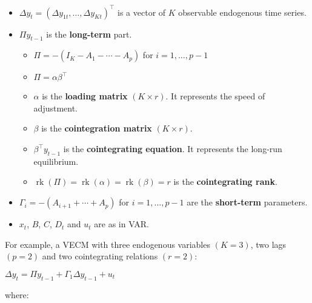 \documentclass[10pt, a4paper, landscape]{article}
\DeclareMathOperator{\rk}{rk}
\begin{document}
\begin{multicols}{2}
\begin{itemize}[leftmargin=*]
	\item \( \Delta y_{t} = (\Delta y_{1t}, \ldots, \Delta y_{Kt})^{\top} \) is a vector of \( K \) observable endogenous time series.
	\item \( \Pi y_{t - 1} \) is the \textbf{long-term} part.
	\begin{itemize}[leftmargin=*, label={\( \diamond \)}]
		\item \( \Pi = - (I_{K} - A_{1} - \cdots - A_{p}) \) for \( i = 1, \ldots, p - 1 \)
		\item \( \Pi = \alpha \beta^{\top} \)
		\item \( \alpha \) is the \textbf{loading matrix} \( (K \times r) \). It represents the speed of adjustment.
		\item \( \beta \) is the \textbf{cointegration matrix} \( (K \times r) \).
		\item \( \beta^{\top} y_{t - 1} \) is the \textbf{cointegrating equation}. It represents the long-run equilibrium.
		\item \( \rk(\Pi) = \rk(\alpha) = \rk(\beta) = r \) is the \textbf{cointegrating rank}.
	\end{itemize}
	\item \( \Gamma_{i} = - (A_{i + 1} + \cdots + A_{p}) \) for \( i = 1, \ldots, p - 1 \) are the \textbf{short-term} parameters.
	\item \( x_{t} \), \( B \), \( C \), \( D_{t} \) and \( u_{t} \) are as in VAR.
\end{itemize}

For example, a VECM with three endogenous variables \( (K = 3) \), two lags \( (p = 2) \) and two cointegrating relations \( (r = 2) \):

\begin{center}
	\( \Delta y_{t} = \Pi y_{t - 1} + \Gamma_{1} \Delta y_{t - 1} + u_{t} \)
\end{center}

\quad where:


\end{multicols}
\end{document}
